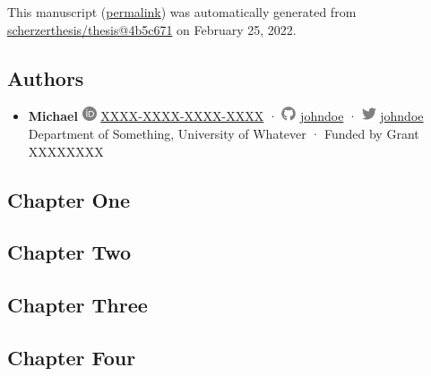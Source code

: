 This manuscript
(\href{https://scherzerthesis.github.io/thesis/v/4b5c6713c2ae2a6acce7bb48b51d224ab05aa2d6/}{permalink})
was automatically generated
from \href{https://github.com/scherzerthesis/thesis/tree/4b5c6713c2ae2a6acce7bb48b51d224ab05aa2d6}{scherzerthesis/thesis@4b5c671}
on February 25, 2022.

\hypertarget{authors}{%
\subsection{Authors}\label{authors}}

\begin{itemize}
\tightlist
\item
  \textbf{Michael}
  \includegraphics[width=0.16667in,height=0.16667in]{images/orcid.svg}
  \href{https://orcid.org/XXXX-XXXX-XXXX-XXXX}{XXXX-XXXX-XXXX-XXXX}
  · \includegraphics[width=0.16667in,height=0.16667in]{images/github.svg}
  \href{https://github.com/johndoe}{johndoe}
  · \includegraphics[width=0.16667in,height=0.16667in]{images/twitter.svg}
  \href{https://twitter.com/johndoe}{johndoe}
  Department of Something, University of Whatever
  · Funded by Grant XXXXXXXX
\end{itemize}

\hypertarget{chapter-one}{%
\subsection{Chapter One}\label{chapter-one}}

\hypertarget{chapter-two}{%
\subsection{Chapter Two}\label{chapter-two}}

\hypertarget{chapter-three}{%
\subsection{Chapter Three}\label{chapter-three}}

\hypertarget{chapter-four}{%
\subsection{Chapter Four}\label{chapter-four}}

